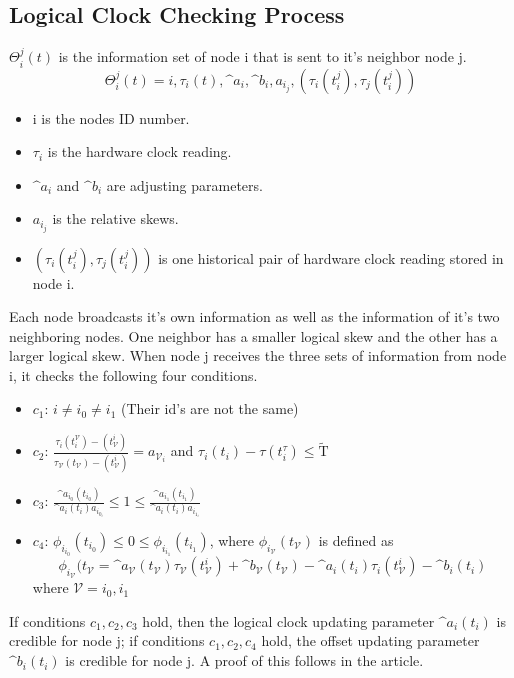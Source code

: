 \documentclass{article}
\begin{document}
\subsection{Logical Clock Checking Process}
$\Theta^j_i(t)$ is the information set of node i that is sent to it's neighbor node j.
\begin{equation}
    \Theta^j_i(t) = {i,\tau_i(t), \^{a}_i,\^{b}_i,a_i_j,(\tau_i(t^j_i),\tau_j(t^j_i))} \nonumber
\end{equation}
\begin{itemize}
    \item i is the nodes ID number.
    \item $\tau_i$ is the hardware clock reading.
    \item $\^{a}_i$ and $\^{b}_i$ are adjusting parameters.
    \item $a_i_j$ is the relative skews.
    \item $(\tau_i(t^j_i),\tau_j(t^j_i))$ is one historical pair of hardware clock reading stored in node i.
\end{itemize}
Each node broadcasts it's own information as well as the information of it's two neighboring nodes. One neighbor has a smaller logical skew and the other has a larger logical skew. When node j receives the three sets of information from node i, it checks the following four conditions.
\begin{itemize}
    \item{$c_1$: $i \neq i_0 \neq i_1$ (Their id's are not the same)}
    \item{$c_2$: $\frac{\tau_i(t^\mathcal{V}_i) - (t^i_\mathcal{V})}{\tau_\mathcal{V}(t_\mathcal{V}) - (t^i_\mathcal{V})} = a_\mathcal{V}_i$ and $\tau_i(t_i) - \tau(t^\tau_i)\leq \tilde{\mathrm{T}}$}
    \item{$c_3$: $\frac{\^a_i_0(t_i_0)}{\^a_i(t_i) a_i_0_i} \leq 1 \leq \frac{\^a_i_1(t_i_1)}{\^a_i(t_i) a_i_1_i} $}
    \item {$c_4$: $\phi_i_i_0(t_i_0) \leq 0 \leq \phi_i_i_1(t_i_1)$, where $\phi_i_\mathcal{V}(t_\mathcal{V})$ is defined as
        \begin{equation}
            \phi_i_\mathcal{V}(t_\mathcal{V} = \^a_\mathcal{V}(t_\mathcal{V})\tau_\mathcal{V}(t^i_\mathcal{V})+\^b_\mathcal{V}(t_\mathcal{V})- \^a_i(t_i)\tau_i(t^i_\mathcal{V}) - \^b_i(t_i)
        \end{equation}
    where $\mathcal{V} = i_0, i_1$}
\end{itemize}
If conditions $c_1, c_2, c_3$ hold, then the logical clock updating parameter $\^a_i(t_i)$ is credible for node j; if conditions $c_1, c_2, c_4$ hold, the offset updating parameter $\^b_i(t_i)$  is credible for node j. A proof of this follows in the article.
\end{document}

